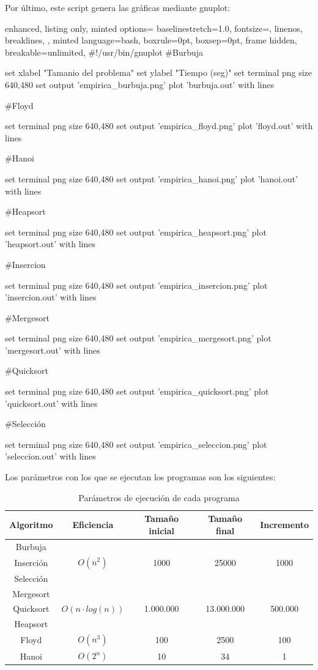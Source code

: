 \documentclass[12pt,spanish]{article}
\begin{document}
Por último, este script genera las gráficas mediante gnuplot:
\begin{multicols}{2}
\begin{tcblisting}
{
  enhanced,
  listing only,
  minted options={
    baselinestretch=1.0,
    fontsize=\footnotesize,
    linenos,
    breaklines,
  },
  minted language=bash,
  boxrule=0pt,
  boxsep=0pt,
  frame hidden,
  breakable=unlimited,
}
#!/usr/bin/gnuplot
#Burbuja

set xlabel "Tamanio del problema"
set ylabel "Tiempo (seg)"
set terminal png size 640,480
set output 'empirica_burbuja.png'
plot 'burbuja.out' with lines

#Floyd

set terminal png size 640,480
set output 'empirica_floyd.png'
plot 'floyd.out' with lines

#Hanoi

set terminal png size 640,480
set output 'empirica_hanoi.png'
plot 'hanoi.out' with lines

#Heapsort

set terminal png size 640,480
set output 'empirica_heapsort.png'
plot 'heapsort.out' with lines

#Insercion

set terminal png size 640,480
set output 'empirica_insercion.png'
plot 'insercion.out' with lines

#Mergesort

set terminal png size 640,480
set output 'empirica_mergesort.png'
plot 'mergesort.out' with lines

#Quicksort

set terminal png size 640,480
set output 'empirica_quicksort.png'
plot 'quicksort.out' with lines

#Selección

set terminal png size 640,480
set output 'empirica_seleccion.png'
plot 'seleccion.out' with lines
\end{tcblisting}
\end{multicols}

Los parámetros con los que se ejecutan los programas son los siguientes:
\begin{table}[H]
\centering
\begin{tabular}{|c|c|c|c|c|}
\hline
\textbf{Algoritmo} & \textbf{Eficiencia} & \textbf{Tamaño inicial} & \textbf{Tamaño final} & \textbf{Incremento}\\
\hline
Burbuja &  &  &  &  \\
Inserción & $O(n^2)$ & 1000 & 25000 & 1000 \\
Selección &  &  & &  \\
\hline
Mergesort & & & & \\
Quicksort & $O(n \cdot log(n))$ & 1.000.000 & 13.000.000 & 500.000 \\
Heapsort &  & & &  \\
\hline
Floyd & $O(n^3)$ & 100 & 2500 & 100 \\
\hline
Hanoi & $O(2^n)$ & 10 & 34 & 1 \\
\hline
\end{tabular}
\caption{Parámetros de ejecución de cada programa}
\end{table}
\end{document}
